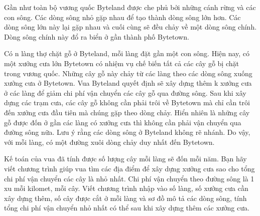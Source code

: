 Gần như toàn bộ vương quốc Byteland được che phủ bởi những cánh rừng và các con sông. Các dòng sông nhỏ gặp nhau để tạo thành dòng sông lớn hơn. Các dòng sông lớn này lại gặp nhau và cuối cùng sẽ đều chảy về một dòng sông chính. Dòng sông chính này đổ ra biển ở gần thành phố Bytetown.  

   Có n làng thợ chặt gỗ ở Byteland, mỗi làng đặt gần một con sông. Hiện nay, có một xưởng cưa lớn Bytetown có nhiệm vụ chế biến tất cả các cây gỗ bị chặt trong vương quốc. Những cây gỗ này chảy từ các làng theo các dòng sông xuống xưởng cưa ở Bytetown. Vua Byteland quyết định sẽ xây dựng thêm k xưởng cưa ở các làng để giảm chi phí vận chuyển các cây gỗ qua đường sông. Sau khi xây dựng các trạm cưa, các cây gỗ không cần phải trôi về Bytetown mà chỉ cần trôi đến xưởng cưa đầu tiên mà chúng gặp theo dòng chảy. Hiển nhiên là những cây gỗ được đốn ở gần các làng có xưởng cưa thì không cần phải vận chuyển qua đường sông nữa. Lưu ý rằng các dòng sông ở Byteland không rẽ nhánh. Do vậy, với mỗi làng, có một đường xuôi dòng chảy duy nhất đến Bytetown.  

   Kế toán của vua đã tính được số lượng cây mỗi làng sẽ đốn mỗi năm. Bạn hãy viết chương trình giúp vua tìm các địa điểm để xây dựng xưởng cưa sao cho tổng chi phí vận chuyển các cây là nhỏ nhất. Chi phí vận chuyển theo đường sông là 1 xu mỗi kilomet, mỗi cây.
Viết chương trình nhập vào số làng, số xưởng cưa cần xây dựng thêm, số cây được cắt ở mỗi làng và sơ đồ mô tả các dòng sông, tính tổng chi phí vận chuyển nhỏ nhất có thể sau khi xây dựng thêm các xưởng cưa.